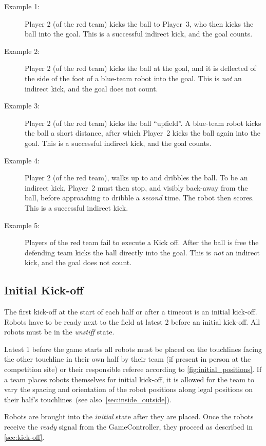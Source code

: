 \begin{description}
  \item[Example 1:] Player 2 (of the red team) kicks the ball to Player~3, who then kicks the ball into the goal. This is a successful indirect kick, and the goal counts.
  \item[Example 2:] Player 2 (of the red team) kicks the ball at the goal, and it is deflected of the side of the foot of a blue-team robot into the goal. This is \textit{not} an indirect kick, and the goal does not count.
  \item[Example 3:] Player 2 (of the red team) kicks the ball ``upfield''. A blue-team robot kicks the ball a short distance, after which Player~2 kicks the ball again into the goal. This is a successful indirect kick, and the goal counts.
  \item[Example 4:] Player 2 (of the red team), walks up to and dribbles the ball. To be an indirect kick, Player~2 must then stop, and visibly back-away from the ball, before approaching to dribble a \textit{second} time. The robot then scores. This is a successful indirect kick.
  \item[Example 5:] Players of the red team fail to execute a Kick off. After the ball is free the defending team kicks the ball directly into the goal. This is \textit{not} an indirect kick, and the goal does not count.
\end{description}

\subsection{Initial Kick-off}
\label{sec:initial-kick-off}

The first kick-off at the start of each half or after a timeout is an initial kick-off. Robots have to be ready next to the field at latest \qty{2}{\min} before an initial kick-off. All robots must be in the \textit{unstiff} state.

Latest \qty{1}{\min} before the game starts all robots must be placed on the touchlines facing the other touchline in their own half by their team (if present in person at the competition site) or their responsible referee according to \cref{fig:initial_positions}. If a team places robots themselves for initial kick-off, it is allowed for the team to vary the spacing and orientation of the robot positions along legal positions on their half's touchlines~(see also~\cref{sec:inside_outside}).

Robots are brought into the \textit{initial} state after they are placed. Once the robots receive the \emph{ready} signal from the GameController, they proceed as described in \cref{sec:kick-off}.

